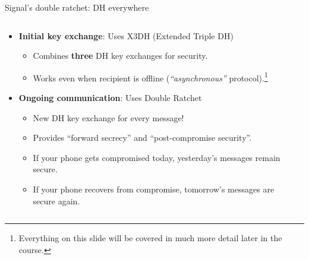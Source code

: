 \documentclass[aspectratio=169, lualatex, handout]{beamer}
\begin{document}
\begin{frame}{Signal's double ratchet: DH everywhere}
	\begin{columns}[c]
		\begin{column}{0.7\textwidth}
			\begin{itemize}
				\item \textbf{Initial key exchange}: Uses X3DH (Extended Triple DH)
				      \begin{itemize}
					      \item Combines \textbf{three} DH key exchanges for security.
					      \item Works even when recipient is offline (\textit{``asynchronous''} protocol).\footnote{Everything on this slide will be covered in much more detail later in the course.}
				      \end{itemize}
				\item \textbf{Ongoing communication}: Uses Double Ratchet
				      \begin{itemize}
					      \item New DH key exchange for every message!
					      \item Provides ``forward secrecy'' and ``post-compromise security''.
					      \item If your phone gets compromised today, yesterday's messages remain secure.
					      \item If your phone recovers from compromise, tomorrow's messages are secure again.
				      \end{itemize}
			\end{itemize}
		\end{column}
		\begin{column}{0.3\textwidth}
		\end{column}
	\end{columns}
\end{frame}
\end{document}
